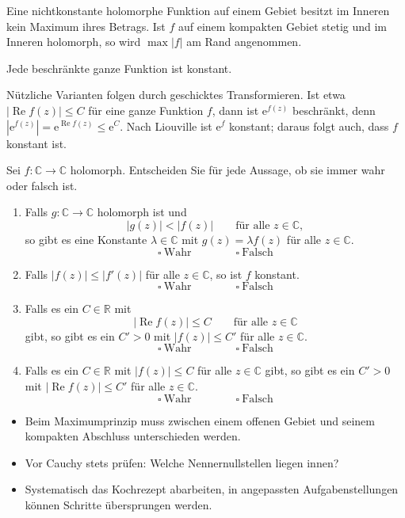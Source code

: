 \documentclass[11pt,a4paper]{article}
\newcommand{\C}{\mathbb C}
\newcommand{\R}{\mathbb R}
\newcommand{\ee}{\mathrm e}
\newcommand{\Ree}{\operatorname{Re}}
\newcommand{\1}{\mathbf 1}
\begin{document}
{\begin{satzbox}[title=Maximum-Modulus-Prinzip]
Eine nichtkonstante holomorphe Funktion auf einem Gebiet besitzt im Inneren kein
Maximum ihres Betrags. Ist $f$ auf einem kompakten Gebiet stetig und im Inneren
holomorph, so wird $\max|f|$ am Rand angenommen.
\end{satzbox}

\begin{satzbox}[title=Satz von Liouville]
Jede beschränkte ganze Funktion ist konstant.
\end{satzbox}

Nützliche Varianten folgen durch geschicktes Transformieren. Ist etwa
$|\Ree f(z)|\le C$ für eine ganze Funktion $f$, dann ist $\ee^{f(z)}$ beschränkt,
denn $|\ee^{f(z)}|=\ee^{\Ree f(z)}\le\ee^C$. Nach Liouville ist $\ee^f$
konstant; daraus folgt auch, dass $f$ konstant ist.

\begin{mcbox}[title=MC-Training: Liouville und ganze Funktionen]
Sei $f:\C\to\C$ holomorph. Entscheiden Sie für jede Aussage, ob sie immer wahr
oder falsch ist.
\begin{enumerate}
\item Falls $g:\C\to\C$ holomorph ist und
\[
|g(z)|<|f(z)|\qquad\text{für alle }z\in\C,
\]
so gibt es eine Konstante $\lambda\in\C$ mit
$g(z)=\lambda f(z)$ für alle $z\in\C$.
\[
\square\ \text{Wahr}\qquad\qquad\square\ \text{Falsch}
\]

\item Falls $|f(z)|\le|f'(z)|$ für alle $z\in\C$, so ist $f$ konstant.
\[
\square\ \text{Wahr}\qquad\qquad\square\ \text{Falsch}
\]

\item Falls es ein $C\in\R$ mit
\[
|\Ree f(z)|\le C\qquad\text{für alle }z\in\C
\]
gibt, so gibt es ein $C'>0$ mit $|f(z)|\le C'$ für alle $z\in\C$.
\[
\square\ \text{Wahr}\qquad\qquad\square\ \text{Falsch}
\]

\item Falls es ein $C\in\R$ mit $|f(z)|\le C$ für alle $z\in\C$ gibt, so
gibt es ein $C'>0$ mit $|\Ree f(z)|\le C'$ für alle $z\in\C$.
\[
\square\ \text{Wahr}\qquad\qquad\square\ \text{Falsch}
\]
\end{enumerate}
\end{mcbox}

\begin{pruefungsbox}
\begin{itemize}
\item Beim Maximumprinzip muss zwischen einem offenen Gebiet und seinem kompakten
Abschluss unterschieden werden.
\item Vor Cauchy stets prüfen: Welche Nennernullstellen liegen innen? 
\item Systematisch das Kochrezept abarbeiten, in angepassten Aufgabenstellungen können Schritte übersprungen werden.
\end{itemize}
\end{pruefungsbox}
}

\ThemeTwo
\ThemeThree
\ThemeFour
\ThemeFive
\ThemeSix
\FinalStrategy
\end{document}
